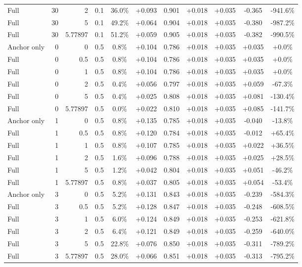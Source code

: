 \begin{table}[htbp]
\begin{tabular}{lrrrccccccc}
Full & 30 & 2 & 0.1 & 36.0\% & +0.093 & 0.901 & +0.018 & +0.035 & -0.365 & -941.6\% \\
Full & 30 & 5 & 0.1 & 49.2\% & +0.064 & 0.904 & +0.018 & +0.035 & -0.380 & -987.2\% \\
Full & 30 & 5.77897 & 0.1 & 51.2\% & +0.059 & 0.905 & +0.018 & +0.035 & -0.382 & -990.5\% \\
Anchor only & 0 & 0 & 0.5 & 0.8\% & +0.104 & 0.786 & +0.018 & +0.035 & +0.035 & +0.0\% \\
Full & 0 & 0.5 & 0.5 & 0.8\% & +0.104 & 0.786 & +0.018 & +0.035 & +0.035 & +0.0\% \\
Full & 0 & 1 & 0.5 & 0.8\% & +0.104 & 0.786 & +0.018 & +0.035 & +0.035 & +0.0\% \\
Full & 0 & 2 & 0.5 & 0.4\% & +0.056 & 0.797 & +0.018 & +0.035 & +0.059 & -67.3\% \\
Full & 0 & 5 & 0.5 & 0.4\% & +0.025 & 0.808 & +0.018 & +0.035 & +0.081 & -130.4\% \\
Full & 0 & 5.77897 & 0.5 & 0.0\% & +0.022 & 0.810 & +0.018 & +0.035 & +0.085 & -141.7\% \\
Anchor only & 1 & 0 & 0.5 & 0.8\% & +0.135 & 0.785 & +0.018 & +0.035 & -0.040 & -13.8\% \\
Full & 1 & 0.5 & 0.5 & 0.8\% & +0.120 & 0.784 & +0.018 & +0.035 & -0.012 & +65.4\% \\
Full & 1 & 1 & 0.5 & 0.8\% & +0.107 & 0.785 & +0.018 & +0.035 & +0.022 & +36.5\% \\
Full & 1 & 2 & 0.5 & 1.6\% & +0.096 & 0.788 & +0.018 & +0.035 & +0.025 & +28.5\% \\
Full & 1 & 5 & 0.5 & 1.2\% & +0.042 & 0.804 & +0.018 & +0.035 & +0.051 & -46.2\% \\
Full & 1 & 5.77897 & 0.5 & 0.8\% & +0.037 & 0.805 & +0.018 & +0.035 & +0.054 & -53.4\% \\
Anchor only & 3 & 0 & 0.5 & 5.2\% & +0.131 & 0.843 & +0.018 & +0.035 & -0.239 & -584.3\% \\
Full & 3 & 0.5 & 0.5 & 5.2\% & +0.128 & 0.847 & +0.018 & +0.035 & -0.248 & -608.5\% \\
Full & 3 & 1 & 0.5 & 6.0\% & +0.124 & 0.849 & +0.018 & +0.035 & -0.253 & -621.8\% \\
Full & 3 & 2 & 0.5 & 6.4\% & +0.121 & 0.849 & +0.018 & +0.035 & -0.259 & -640.0\% \\
Full & 3 & 5 & 0.5 & 22.8\% & +0.076 & 0.850 & +0.018 & +0.035 & -0.311 & -789.2\% \\
Full & 3 & 5.77897 & 0.5 & 28.0\% & +0.066 & 0.851 & +0.018 & +0.035 & -0.313 & -795.2\% \\

\end{tabular}
\end{table}
